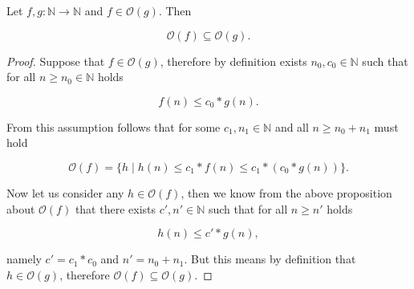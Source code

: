 \documentclass{article}
\title{}
\author{Adam Fiedler}
\begin{document}
\maketitle

Let $f, g : \mathbb{N} \rightarrow \mathbb{N}$ and $f \in \mathcal{O}(g)$. Then

\[ \mathcal{O}(f) \subseteq \mathcal{O}(g). \]

\begin{proof}

Suppose that $f \in \mathcal{O}(g)$, therefore by definition exists $n_0, c_0 \in \mathbb{N}$ such that for all $n \geq n_0 \in \mathbb{N}$ holds 

\[f(n) \leq c_0 * g(n).\]

From this assumption follows that for some $c_1, n_1 \in \mathbb{N}$ and all $n \geq n_0 + n_1$ must hold

\[ \mathcal{O}(f) = \{ h \mid h(n) \leq c_1 * f(n) \leq c_1 * (c_0 * g(n)) \}. \]

Now let us consider any $h \in \mathcal{O}(f)$, then we know from the above proposition about $\mathcal{O}(f)$ that there exists $c', n' \in \mathbb{N}$ such that for all $n \geq n'$ holds

\[ h(n) \leq c' * g(n), \]

\noindent namely $c' = c_1 * c_0$ and $n' = n_0 + n_1$. But this means by definition that $h \in \mathcal{O}(g)$, therefore $\mathcal{O}(f) \subseteq \mathcal{O}(g)$.

\end{proof}
\end{document}
